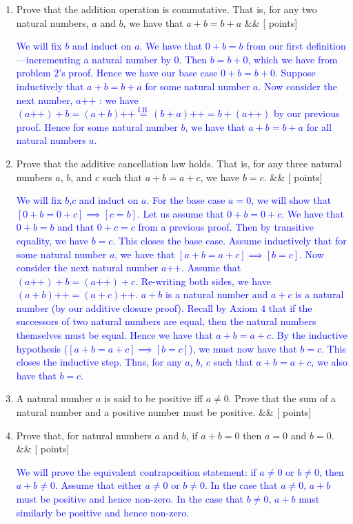\documentclass[12pt]{article}
\newcommand{\points}[1]{\hfill {[#1 points]}}
\newcommand{\problem}[2][]{%
  \item {#2}%
  \ifx&#1&%
  \else%
    \points{#1}%
  \fi
  \par\vspace{0.5em}
}
\begin{document}
\begin{enumerate}[leftmargin=*, label=\textbf{\arabic*.}]
	 \problem{Prove that the addition operation is commutative. That is, for any two natural numbers, $a$ and $b$, we have that $a+b = b+a$}
    	\textcolor{blue}{We will fix $b$ and induct on $a$. We have that $0 + b = b$ from our first definition—incrementing a natural number by 0. Then $b = b + 0$, which we have from problem $2$'s proof. Hence we have our base case $0 + b = b + 0$. Suppose inductively that $a + b = b + a$ for some natural number $a$. Now consider the next number, $a\text{++}$ : we have $(a\text{++}) + b = (a + b)\text{++} \overset{\text{I.H.}}{=} (b + a)\text{++} = b+(a\text{++})$ by our previous proof. Hence for some natural number $b$, we have that $a + b = b + a$ for all natural numbers $a$.}
	
	
	\problem{Prove that the additive cancellation law holds. That is, for any three natural numbers $a$, $b$, and $c$ such that $a + b = a + c$, we have $b = c$.}
    	\textcolor{blue}{We will fix $b$,$c$ and induct on $a$. For the base case $a=0$, we will show that $[0+b=0+c] \implies [c=b]$. Let us assume that $0+b=0+c$. We have that $0+b=b$ and that $0+c=c$ from a previous proof. Then by transitive equality, we have $b=c$. This closes the base case. Assume inductively that for some natural number $a$, we have that $[a+b=a+c] \implies [b=c]$. Now consider the next natural number $a\text{++}$. Assume that $(a\text{++})+b=(a\text{++})+c$. Re-writing both sides, we have $(a+b)\text{++} = (a+c)\text{++}$. $a+b$ is a natural number and $a+c$ is a natural number (by our additive closure proof). Recall by Axiom $4$ that if the successors of two natural numbers are equal, then the natural numbers themselves must be equal. Hence we have that $a+b = a+c$. By the inductive hypothesis ($[a+b=a+c]  \implies [b=c]$), we must now have that $b=c$. This closes the inductive step. Thus, for any $a$, $b$, $c$ such that $a + b = a + c$, we also have that $b = c$.}
	
	\problem{A natural number $a$ is said to be positive iff $a \neq 0$. Prove that the sum of a natural number and a positive number must be positive.}
	\textcolor{blue}{}
	
	\problem{Prove that, for natural numbers $a$ and $b$, if $a + b = 0$ then $a = 0$ and $b = 0$.}
	\textcolor{blue}{We will prove the equivalent contraposition statement: if $a \neq 0$ or $b \neq 0$, then $a + b \neq 0$. Assume that either $a \neq 0$ or $b \neq 0$. In the case that $a \neq 0$, $a+b$ must be positive and hence non-zero. In the case that $b \neq 0$, $a+b$ must similarly be positive and hence non-zero.}
	

\end{enumerate}
\end{document}
